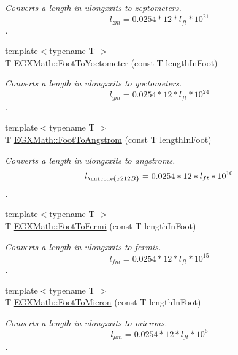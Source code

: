 \begin{DoxyCompactItemize}
\begin{DoxyCompactList}\small\item\em Converts a length in ulongxxits to zeptometers. \[ l_{zm}=0.0254 * 12 * l_{ft} * 10^{21} \]. \end{DoxyCompactList}\item 
{\footnotesize template$<$typename T $>$ }\\T \mbox{\hyperlink{group___e_g_x_math-_conversions-_length_conversions-_imperial-_foot-_s_i_ga6a04aa5a8be3bebe58307e334d433a40}{E\+G\+X\+Math\+::\+Foot\+To\+Yoctometer}} (const T length\+In\+Foot)
\begin{DoxyCompactList}\small\item\em Converts a length in ulongxxits to yoctometers. \[ l_{ym}=0.0254 * 12 * l_{ft} * 10^{24} \]. \end{DoxyCompactList}\item 
{\footnotesize template$<$typename T $>$ }\\T \mbox{\hyperlink{group___e_g_x_math-_conversions-_length_conversions-_imperial-_foot-_non-_s_i_ga39b1712b38ad7c61cb859376f07decda}{E\+G\+X\+Math\+::\+Foot\+To\+Angstrom}} (const T length\+In\+Foot)
\begin{DoxyCompactList}\small\item\em Converts a length in ulongxxits to angstroms. \[ l_{\unicode{x212B}}=0.0254 * 12 * l_{ft} * 10^{10} \]. \end{DoxyCompactList}\item 
{\footnotesize template$<$typename T $>$ }\\T \mbox{\hyperlink{group___e_g_x_math-_conversions-_length_conversions-_imperial-_foot-_non-_s_i_gac61392c75e58e12f6a8a99aa765f22a0}{E\+G\+X\+Math\+::\+Foot\+To\+Fermi}} (const T length\+In\+Foot)
\begin{DoxyCompactList}\small\item\em Converts a length in ulongxxits to fermis. \[ l_{fm}=0.0254 * 12 * l_{ft} * 10^{15} \]. \end{DoxyCompactList}\item 
{\footnotesize template$<$typename T $>$ }\\T \mbox{\hyperlink{group___e_g_x_math-_conversions-_length_conversions-_imperial-_foot-_non-_s_i_ga0360d043c5150d90e61ad28c1fb81cc1}{E\+G\+X\+Math\+::\+Foot\+To\+Micron}} (const T length\+In\+Foot)
\begin{DoxyCompactList}\small\item\em Converts a length in ulongxxits to microns. \[ l_{\mu m}=0.0254 * 12 * l_{ft} * 10^{6} \]. \end{DoxyCompactList}\item 

\end{DoxyCompactItemize}

